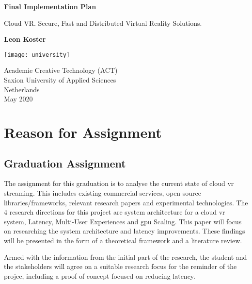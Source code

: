 \documentclass[]{article}
\begin{document}
\begin{titlepage}
   \begin{center}
       \vspace*{1cm}

       \textbf{Final Implementation Plan}

       \vspace{0.5cm}
       Cloud VR. Secure, Fast and Distributed Virtual Reality Solutions.
       \vspace{1.5cm}

       \textbf{Leon Koster}

       \vfill
            
       \vspace{0.8cm}
     
      \texttt{[image: university]}
            
       Academie Creative Technology (ACT)\\
       Saxion University of Applied Sciences\\
       Netherlands\\
       May 2020
            
   \end{center}
\end{titlepage}

\tableofcontents
\newpage
\printnoidxglossary[type=\acronymtype]



\newpage
\section{Reason for Assignment}
\subsection{Graduation Assignment}
The assignment for this graduation is to analyse the current state of cloud \acrshort{vr} streaming. This includes existing commercial services, open source libraries/frameworks, relevant research papers and experimental technologies. The 4 research directions for this project are system architecture for a cloud \acrshort{vr} system, Latency, Multi-User Experiences and \acrshort{gpu} Scaling. This paper will focus on researching the system architecture and latency improvements. These findings will be presented in the form of a theoretical framework and a literature review.

Armed with the information from the initial part of the research, the student and the stakeholders will agree on a suitable research focus for the reminder of the projec, including a proof of concept focused on reducing latency.
\end{document}
